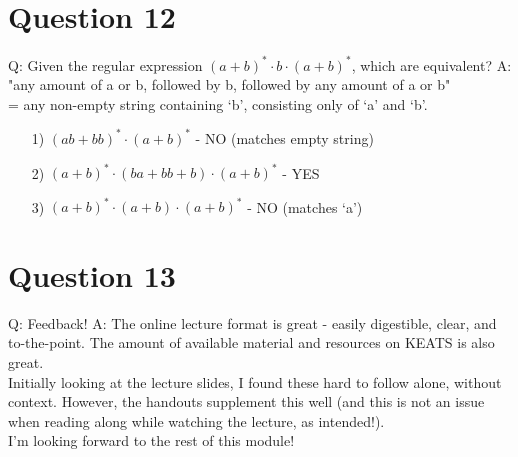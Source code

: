 \documentclass[english]{scrartcl}
\begin{document}
\section*{Question 12}
Q: Given the regular expression $(a+b)^* \cdot b \cdot (a+b)^*$, which are equivalent?
\newline
A: "any amount of a or b, followed by b, followed by any amount of a or b" \\
= any non-empty string containing `b', consisting only of `a' and `b'.
\begin{itemize}
    \item[1)] $(ab+bb)^* \cdot (a+b)^*$ - NO (matches empty string)
    \item[2)] $(a+b)^* \cdot (ba + bb + b) \cdot (a+b)^*$ - YES
    \item[3)] $(a+b)^* \cdot (a + b) \cdot (a+b)^*$ - NO (matches `a')
\end{itemize}

\section*{Question 13}
Q: Feedback!
\newline
A: The online lecture format is great - easily digestible, clear, and to-the-point.
The amount of available material and resources on KEATS is also great.
\\
Initially looking at the lecture slides, I found these hard to follow alone, without context. However, the handouts supplement this well (and this is not an issue when reading along while watching the lecture, as intended!).
\\
I'm looking forward to the rest of this module!
\end{document}
